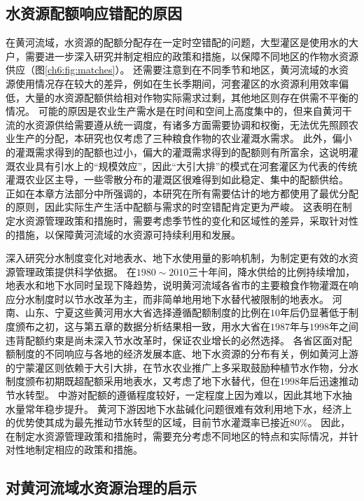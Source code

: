\subsection{水资源配额响应错配的原因}

在黄河流域，水资源的配额分配存在一定时空错配的问题，大型灌区是使用水的大户，需要进一步深入研究并制定相应的政策和措施，以保障不同地区的作物水资源供应（图\ref{ch6:fig:matches}）。
还需要注意到在不同季节和地区，黄河流域的水资源使用情况存在较大的差异，例如在生长季期间，河套灌区的水资源利用效率偏低，大量的水资源配额供给相对作物实际需求过剩，其他地区则存在供需不平衡的情况。
可能的原因是农业生产需水是在时间和空间上高度集中的，但来自黄河干流的水资源供给需要遵从统一调度，有诸多方面需要协调和权衡，无法优先照顾农业生产的分配，本研究也仅考虑了三种粮食作物的农业灌溉水需求。
此外，偏小的灌溉需求得到的配额也过小，偏大的灌溉需求得到的配额则有所富余，这说明灌溉农业具有引水上的“规模效应”，因此“大引大排”的模式在河套灌区为代表的传统灌溉农业区主导，一些零散分布的灌溉区很难得到如此稳定、集中的配额供给。
正如在本章方法部分中所强调的，本研究在所有需要估计的地方都使用了最优分配的原则，因此实际生产生活中配额与需求的时空错配肯定更为严峻。
这表明在制定水资源管理政策和措施时，需要考虑季节性的变化和区域性的差异，采取针对性的措施，以保障黄河流域的水资源可持续利用和发展。

深入研究分水制度变化对地表水、地下水使用量的影响机制，为制定更有效的水资源管理政策提供科学依据。
在$1980 \sim 2010$三十年间，降水供给的比例持续增加，地表水和地下水同时呈现下降趋势，说明黄河流域各省市的主要粮食作物灌溉在响应分水制度时以节水改革为主，而非简单地用地下水替代被限制的地表水。
河南、山东、宁夏这些黄河用水大省选择遵循配额制度的比例在$10$年后仍显著低于制度颁布之初，这与第五章的数据分析结果相一致，用水大省在$1987$年与$1998$年之间违背配额约束是尚未深入节水改革时，保证农业增长的必然选择。
各省区面对配额制度的不同响应与各地的经济发展本底、地下水资源的分布有关，例如黄河上游的宁蒙灌区则依赖于大引大排，在节水农业推广上多采取鼓励种植节水作物，分水制度颁布初期既超配额采用地表水，又考虑了地下水替代，但在$1998$年后迅速推动节水转型。
中游对配额的遵循程度较好，一定程度上因为难以，因此其地下水抽水量常年稳步提升。
黄河下游因地下水盐碱化问题很难有效利用地下水，经济上的优势使其成为最先推动节水转型的区域，目前节水灌溉率已接近$80\%$。
因此，在制定水资源管理政策和措施时，需要充分考虑不同地区的特点和实际情况，并针对性地制定相应的政策和措施。

\subsection{对黄河流域水资源治理的启示}

